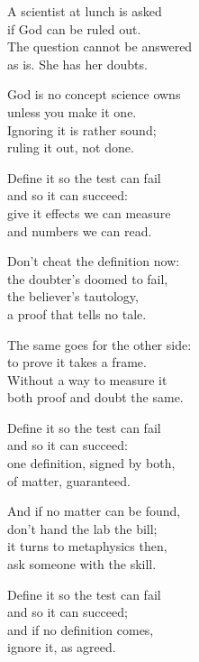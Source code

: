 \begin{lyrics}
A scientist at lunch is asked\\
if God can be ruled out.\\
The question cannot be answered\\
as is. She has her doubts.

God is no concept science owns\\
unless you make it one.\\
Ignoring it is rather sound;\\
ruling it out, not done.

Define it so the test can fail\\
and so it can succeed:\\
give it effects we can measure\\
and numbers we can read.

Don't cheat the definition now:\\
the doubter's doomed to fail,\\
the believer's tautology,\\
a proof that tells no tale.

The same goes for the other side:\\
to prove it takes a frame.\\
Without a way to measure it\\
both proof and doubt the same.

Define it so the test can fail\\
and so it can succeed:\\
one definition, signed by both,\\
of matter, guaranteed.

And if no matter can be found,\\
don't hand the lab the bill;\\
it turns to metaphysics then,\\
ask someone with the skill.

Define it so the test can fail\\
and so it can succeed;\\
and if no definition comes,\\
ignore it, as agreed.
\end{lyrics}

